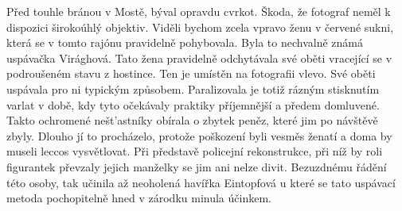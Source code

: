 
Před touhle bránou v Mostě, býval opravdu cvrkot. Škoda, že fotograf neměl k
dispozici širokoúhlý objektiv. Viděli bychom zcela vpravo ženu v červené sukni,
která se v tomto rajónu pravidelně pohybovala. Byla to nechvalně známá
uspávačka Virághová. Tato žena pravidelně odchytávala své oběti vracející se v
podroušeném stavu z hostince. Ten je umístěn na fotografii vlevo. Své oběti
uspávala pro ni typickým způsobem. Paralizovala je totiž rázným stisknutím
varlat v době, kdy tyto očekávaly praktiky příjemnější a předem domluvené.
Takto ochromené nešt'astníky obírala o zbytek peněz, které jim po návštěvě
zbyly. Dlouho jí to procházelo, protože poškození byli vesměs ženatí a doma by
museli leccos vysvětlovat. Při představě policejní rekonstrukce, při níž by
roli figurantek převzaly jejich manželky se jim ani nelze divit. Bezuzdnému
řádění této osoby, tak učinila až neoholená havířka Eintopfová u které se tato
uspávací metoda pochopitelně hned v zárodku minula účinkem.
